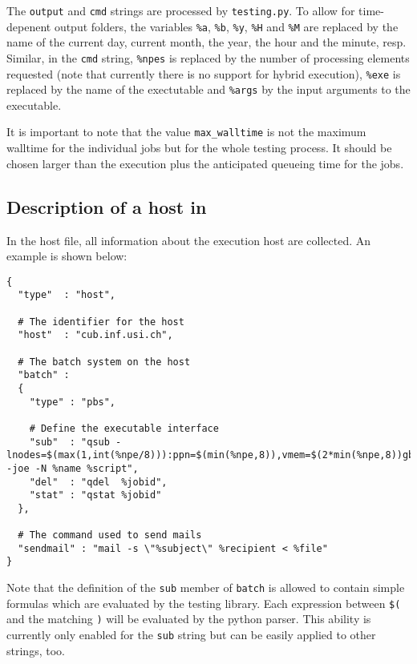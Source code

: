 The \lstinline[style=SHELL]|output| and \lstinline[style=SHELL]|cmd| strings are processed by \lstinline[style=SHELL]|testing.py|. To allow for time-depenent output folders, the variables \lstinline[style=SHELL]|%a|, \lstinline[style=SHELL]|%b|, \lstinline[style=SHELL]|%y|, \lstinline[style=SHELL]|%H| and \lstinline[style=SHELL]|%M| are replaced by the name of the current day, current month, the year, the hour and the minute, resp. Similar, in the \MPI \lstinline[style=SHELL]|cmd| string, \lstinline[style=SHELL]|%npes| is replaced by the number of processing elements requested (note that currently there is no support for hybrid execution), \lstinline[style=SHELL]|%exe| is replaced by the name of the exectutable and \lstinline[style=SHELL]|%args| by the input arguments to the executable.

It is important to note that the value \lstinline[style=SHELL]|max_walltime| is not the maximum walltime for the individual jobs but for the whole testing process. It should be chosen larger than the execution plus the anticipated queueing time for the jobs.

\subsection{Description of a host in \JSON}

In the host file, all information about the execution host are collected. An example is shown below:

\begin{lstlisting}[style=SHELL_SMALL,frame=lines]
{
  "type"  : "host",
  
  # The identifier for the host
  "host"  : "cub.inf.usi.ch",

  # The batch system on the host
  "batch" :
  {
    "type" : "pbs",

    # Define the executable interface
    "sub"  : "qsub -lnodes=$(max(1,int(%npe/8))):ppn=$(min(%npe,8)),vmem=$(2*min(%npe,8))gb,walltime=%wtime -joe -N %name %script",
    "del"  : "qdel  %jobid",
    "stat" : "qstat %jobid"
  },

  # The command used to send mails
  "sendmail" : "mail -s \"%subject\" %recipient < %file"
}
\end{lstlisting}

Note that the definition of the \lstinline[style=SHELL]|sub| member of \lstinline[style=SHELL]|batch| is allowed to contain simple formulas which are evaluated by the testing library. Each expression between \lstinline[style=SHELL]|$(| and the matching \lstinline[style=SHELL]|)| will be evaluated by the python parser. This ability is currently only enabled for the \lstinline[style=SHELL]|sub| string but can be easily applied to other strings, too. 

